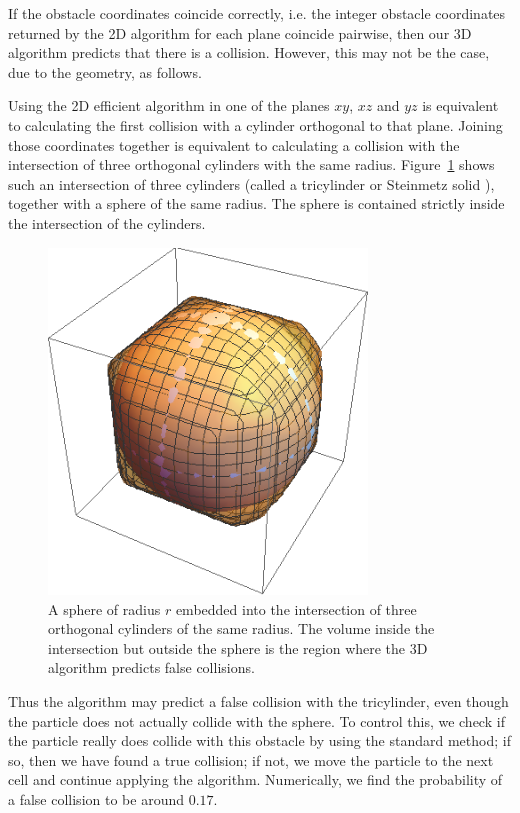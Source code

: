 \documentclass{iopart}
\begin{document}
If the obstacle coordinates coincide correctly, i.e. the integer obstacle coordinates returned by the 2D algorithm for each plane coincide pairwise, then our 3D algorithm predicts that there is a collision. However, this may not be the case, due to the geometry, as follows.

Using the 2D efficient algorithm in one of the planes $xy$, $xz$ and $yz$ is equivalent to calculating the first collision with a cylinder orthogonal to that plane. Joining those coordinates together is equivalent to calculating a collision with the intersection of three orthogonal cylinders with the same radius. 
Figure~\ref{fig:collision} shows such an intersection of three cylinders (called a tricylinder or Steinmetz solid \cite{tricylinder1974}), together with a sphere of the same radius. The sphere is contained strictly inside the intersection of the cylinders. 
 
\begin{figure}
\centering
\includegraphics [width=240pt]{./region.png}
\caption{A sphere of radius $r$ embedded into the intersection of three orthogonal cylinders of the same radius. The volume inside the intersection but outside the sphere is the region where the 3D algorithm predicts false collisions.}
\label{fig:collision}
\end{figure}
 


Thus the algorithm may predict a false collision with the tricylinder, even though the particle does not actually collide with the sphere. To control this, we check if the particle really does collide with this obstacle by using the standard method; if so, then we have found a true collision; if not, we move the particle to the next cell and continue applying the algorithm. 
Numerically, we find the probability of a false collision to be around $0.17$. 
% 
\end{document}

